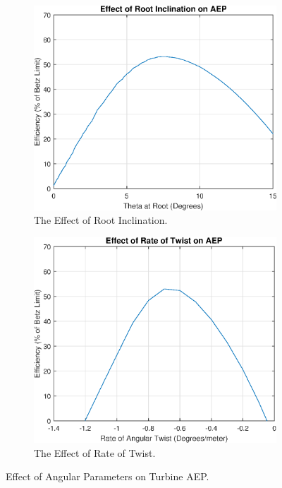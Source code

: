 \documentclass[11pt]{article}
\begin{document}
\begin{figure}[ht] 
        \centering
        \begin{subfigure}[b]{0.475\textwidth}
            \centering
            \includegraphics[width=\textwidth]{ChangeTheta0}
            \caption[Network2]%
            {{\small The Effect of Root Inclination. }}    
            \label{fig:changetheta01}
        \end{subfigure}
        \hfill
        \begin{subfigure}[b]{0.475\textwidth}  
            \centering 
            \includegraphics[width=\textwidth]{ChangeThetaTW.eps}
            \caption[]%
            {{\small The Effect of Rate of Twist. }}    
            \label{fig:changetwist}
        \end{subfigure}
        \caption{Effect of Angular Parameters on Turbine AEP.}
        \label{fig:changetheta}
    \end{figure}
\end{document}
